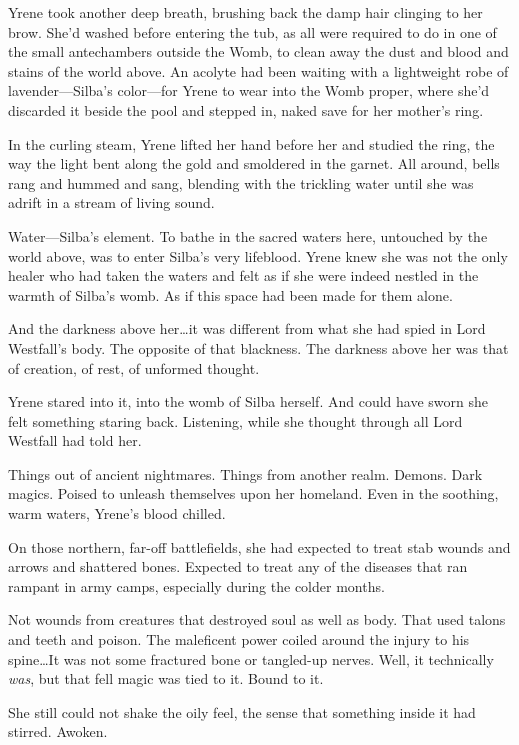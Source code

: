 Yrene took another deep breath, brushing back the damp hair clinging to her brow.
She'd washed before entering the tub, as all were required to do in one of the small antechambers outside the Womb, to clean away the dust and blood and stains of the world above.
An acolyte had been waiting with a lightweight robe of lavender---Silba's color---for Yrene to wear into the Womb proper, where she'd discarded it beside the pool and stepped in, naked save for her mother's ring.

In the curling steam, Yrene lifted her hand before her and studied the ring, the way the light bent along the gold and smoldered in the garnet.
All around, bells rang and hummed and sang, blending with the trickling water until she was adrift in a stream of living sound.

Water---Silba's element.
To bathe in the sacred waters here, untouched by the world above, was to enter Silba's very lifeblood.
Yrene knew she was not the only healer who had taken the waters and felt as if she were indeed nestled in the warmth of Silba's womb.
As if this space had been made for them alone.

And the darkness above her\ldots it was different from what she had spied in Lord Westfall's body.
The opposite of that blackness.
The darkness above her was that of creation, of rest, of unformed thought.

Yrene stared into it, into the womb of Silba herself.
And could have sworn she felt something staring back.
Listening, while she thought through all Lord Westfall had told her.

Things out of ancient nightmares.
Things from another realm.
Demons.
Dark magics.
Poised to unleash themselves upon her homeland.
Even in the soothing, warm waters, Yrene's blood chilled.

On those northern, far-off battlefields, she had expected to treat stab wounds and arrows and shattered bones.
Expected to treat any of the diseases that ran rampant in army camps, especially during the colder months.

Not wounds from creatures that destroyed soul as well as body.
That used talons and teeth and poison.
The maleficent power coiled around the injury to his spine\ldots It was not some fractured bone or tangled-up nerves.
Well, it technically \emph{was}, but that fell magic was tied to it.
Bound to it.

She still could not shake the oily feel, the sense that something inside it had stirred.
Awoken.

